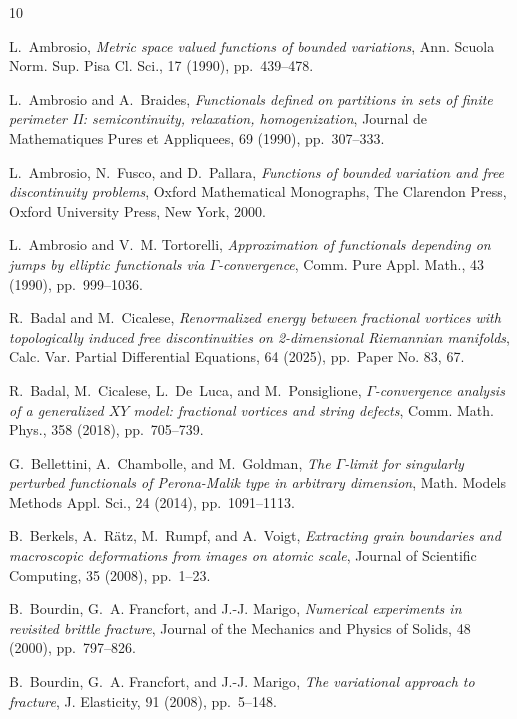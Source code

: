 \documentclass[a4paper,reqno]{amsart}
\theoremstyle{remark}
\numberwithin{equation}{section}
\begin{document}
\begin{thebibliography}{10}

{\sc L.~Ambrosio}, {\em Metric space valued functions of bounded variations},
  Ann. Scuola Norm. Sup. Pisa Cl. Sci., 17 (1990), pp.~439--478.

{\sc L.~Ambrosio and A.~Braides}, {\em Functionals defined on partitions in
  sets of finite perimeter {II}: semicontinuity, relaxation, homogenization},
  Journal de Mathematiques Pures et Appliquees, 69 (1990), pp.~307--333.

{\sc L.~Ambrosio, N.~Fusco, and D.~Pallara}, {\em Functions of bounded
  variation and free discontinuity problems}, Oxford Mathematical Monographs,
  The Clarendon Press, Oxford University Press, New York, 2000.

{\sc L.~Ambrosio and V.~M. Tortorelli}, {\em Approximation of functionals
  depending on jumps by elliptic functionals via {$\Gamma$}-convergence}, Comm.
  Pure Appl. Math., 43 (1990), pp.~999--1036.

{\sc R.~Badal and M.~Cicalese}, {\em Renormalized energy between fractional
  vortices with topologically induced free discontinuities on 2-dimensional
  {R}iemannian manifolds}, Calc. Var. Partial Differential Equations, 64
  (2025), pp.~Paper No. 83, 67.

{\sc R.~Badal, M.~Cicalese, L.~De~Luca, and M.~Ponsiglione}, {\em
  {$\Gamma$}-convergence analysis of a generalized {$XY$} model: fractional
  vortices and string defects}, Comm. Math. Phys., 358 (2018), pp.~705--739.

{\sc G.~Bellettini, A.~Chambolle, and M.~Goldman}, {\em The {$\Gamma$}-limit
  for singularly perturbed functionals of {P}erona-{M}alik type in arbitrary
  dimension}, Math. Models Methods Appl. Sci., 24 (2014), pp.~1091--1113.

{\sc B.~Berkels, A.~R{\"a}tz, M.~Rumpf, and A.~Voigt}, {\em Extracting grain
  boundaries and macroscopic deformations from images on atomic scale}, Journal
  of Scientific Computing, 35 (2008), pp.~1--23.

{\sc B.~Bourdin, G.~A. Francfort, and J.-J. Marigo}, {\em Numerical experiments
  in revisited brittle fracture}, Journal of the Mechanics and Physics of
  Solids, 48 (2000), pp.~797--826.

{\sc B.~Bourdin, G.~A. Francfort, and J.-J. Marigo}, {\em The variational
  approach to fracture}, J. Elasticity, 91 (2008), pp.~5--148.


\end{thebibliography}
\end{document}
